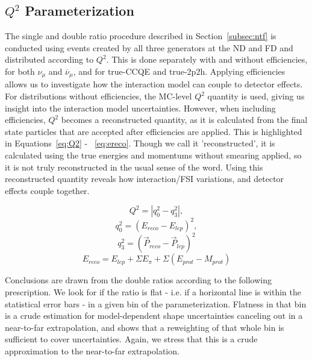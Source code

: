 \documentclass[12pt]{article}
\begin{document}
\subsection{$Q^2$ Parameterization}
\label{subsec:q2}
The single and double ratio procedure described in Section~\ref{subsec:ntf} is conducted using events created by all three generators at the ND and FD and distributed according to $Q^2$. This is done separately with and without efficiencies, for both $\nu_{\mu}$ and $\overline{\nu}_{\mu}$, and for true-CCQE and true-2p2h. Applying efficiencies allows us to investigate how the interaction model can couple to detector effects. For distributions without efficiencies, the MC-level $Q^2$ quantity is used, giving us insight into the interaction model uncertainties. However, when including efficiencies, $Q^2$ becomes a reconstructed quantity, as it is calculated from the final state particles that are accepted after efficiencies are applied. This is highlighted in Equations~\ref{eq:Q2} - ~\ref{eq:ereco}. Though we call it 'reconstructed', it is calculated using the true energies and momentums without smearing applied, so it is not truly reconstructed in the usual sense of the word. Using this reconstructed quantity reveals how interaction/FSI variations, and detector effects couple together.

\begin{equation}
\label{eq:Q2}
Q^2 = |q_0^2 - q_3^2|,
\end{equation}
\begin{equation}
\label{eq:q0}
q_0^2 = (E_{reco} - E_{lep})^2,
\end{equation}
\begin{equation}
\label{eq:q3}
q_3^2 = (\vec{P}_{reco} - \vec{P}_{lep})^2
\end{equation}
\begin{equation}
E_{reco} =E_{lep} + \Sigma E_{\pi} + \Sigma (E_{prot} - M_{prot})
\label{eq:ereco}
\end{equation}

Conclusions are drawn from the double ratios according to the following prescription. We look for if the ratio is flat - i.e. if a horizontal line is within the statistical error bars - in a given bin of the parameterization. Flatness in that bin is a crude estimation for model-dependent shape uncertainties canceling out in a near-to-far extrapolation, and shows that a reweighting of that whole bin is sufficient to cover uncertainties. Again, we stress that this is a crude approximation to the near-to-far extrapolation.
 
\end{document}
